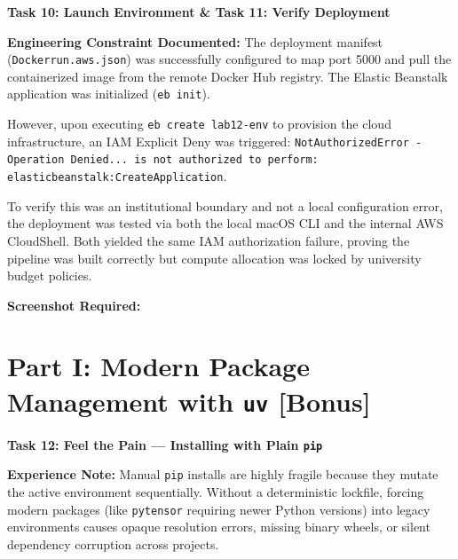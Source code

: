 \documentclass[12pt,a4paper]{article}
\begin{document}
\begin{tcolorbox}
\textbf{Task 10: Launch Environment \& Task 11: Verify Deployment}

\textbf{Engineering Constraint Documented:}
The deployment manifest (\texttt{Dockerrun.aws.json}) was successfully configured to map port 5000 and pull the containerized image from the remote Docker Hub registry. The Elastic Beanstalk application was initialized (\texttt{eb init}).

However, upon executing \texttt{eb create lab12-env} to provision the cloud infrastructure, an IAM Explicit Deny was triggered: 
\texttt{NotAuthorizedError - Operation Denied... is not authorized to perform: elasticbeanstalk:CreateApplication}.

To verify this was an institutional boundary and not a local configuration error, the deployment was tested via both the local macOS CLI and the internal AWS CloudShell. Both yielded the same IAM authorization failure, proving the pipeline was built correctly but compute allocation was locked by university budget policies.

\textbf{Screenshot Required:}
\begin{center}

\end{center}

\end{tcolorbox}


\section*{Part I: Modern Package Management with \texttt{uv} [Bonus]}

\begin{tcolorbox}
\textbf{Task 12: Feel the Pain — Installing with Plain \texttt{pip}}

\textbf{Experience Note:} Manual \texttt{pip} installs are highly fragile because they mutate the active environment sequentially. Without a deterministic lockfile, forcing modern packages (like \texttt{pytensor} requiring newer Python versions) into legacy environments causes opaque resolution errors, missing binary wheels, or silent dependency corruption across projects.

\begin{center}

\end{center}
\end{tcolorbox}
\end{document}
